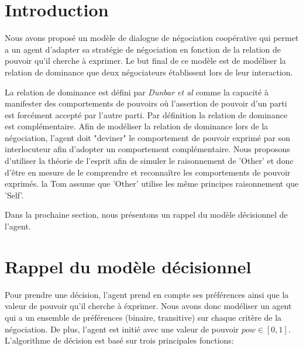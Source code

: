\documentclass{llncs}
\begin{document}
	
	\section{Introduction}
	Nous avons proposé un modèle de dialogue de négociation coopérative  qui permet a un agent d'adapter sa stratégie de négociation en fonction de la relation de pouvoir qu'il cherche à exprimer. 
	Le but final de ce modèle est  de modéliser la relation de dominance que deux négociateurs établissent lors de leur interaction. 
	\par La relation de dominance est défini par \emph{Dunbar et \textit{al}} comme la capacité  à manifester des comportements de pouvoirs o\`u l'assertion de pouvoir d'un parti est forcément accepté par l'autre parti. Par définition la relation de dominance est complémentaire. 
	Afin de modéliser la relation de dominance lors de la négociation, l'agent doit "deviner" le comportement de pouvoir exprimé par son interlocuteur afin d'adopter un comportement complémentaire. 
	Nous proposons d'utiliser la théorie de l'esprit afin de simuler le raisonnement de 'Other' et donc d'être en mesure de le comprendre et reconnaître les comportements de pouvoir exprimés. la Tom assume que 'Other'  utilise les même principes raisonnement que 'Self'. 
	
	Dans la prochaine section, nous présentons un rappel du modèle décisionnel de l'agent. 
	
	
	\section{Rappel du modèle décisionnel}
	Pour prendre une décision, l'agent prend en compte ses préférences ainsi que la valeur de pouvoir qu'il cherche à éxprimer. Nous avons donc modéliser un agent qui a un ensemble de préférences (binaire, transitive) sur chaque critère de la négociation. De plus, l'agent est initié avec une valeur de pouvoir $pow \in [0, 1]$. L'algorithme de décision est basé sur trois principales fonctions:
	
\end{document}
